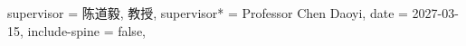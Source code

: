 {  %
  supervisor  = {陈道毅, 教授},
  supervisor* = {Professor Chen Daoyi},
  date = {2027-03-15},
  include-spine = false,
}


\usepackage{amsthm}



\usepackage{threeparttable}

\usepackage{multirow}


\usepackage{longtable}

\usepackage{algorithm}
\usepackage{algorithmic}

\usepackage{siunitx}

\usepackage[sort]{natbib}


% 

% 

% 

% 

\graphicspath{{figures/}}

\makeatletter
\newcommand\dif{%
  \mathop{}\!%
  \ifthu@math@style@TeX
    d%
  \else
    \mathrm{d}%
  \fi
}
\makeatother

\usepackage{hyperref}
